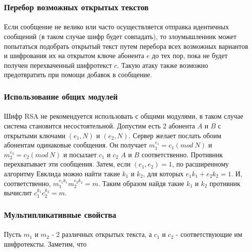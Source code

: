 \subsubsection{Перебор возможных открытых текстов}

  \paragraph{} Если сообщение не велико или часто осуществляется отправка идентичных сообщений (в таком случае шифр будет совпадать), то злоумышленник может попытаться подобрать открытый текст путем перебора всех возможных вариантов и шифрования их на открытом ключе абонента $e$ до тех пор, пока не будет получен перехваченный 
  шифротекст $c$. Такую атаку также возможно предотвратить при помощи добавок в сообщение.

\subsubsection{Использование общих модулей}

  \paragraph{} Шифр RSA не рекомендуется использовать с общими модулями, в таком случае система  становится несостоятельной. Допустим есть 2 абонента $A$ и $B$ с 
  открытыми ключами $(e_{1}, N)$ и $(e_{2}, N)$. Сервер желает послать обоим абонентам одинаковые сообщения. 
  Он получает $m_1^{e_1} = c_1(mod \: N)$ и $m_2^{e_2} = c_2(mod \: N)$ и посылает $c_1$ и 
  $c_2$ $A$ и $B$ соответственно. Противник перехватывает эти сообщения. Затем, если $(e_1, e_2) = 1$, по 
  расширенному алгоритму Евклида можно найти такие $k_1$ и $k_2$, для которых $e_1 k_1 + e_2 k_2 = 1$. И, соответственно, 
  $m_1^{e_1 k_1} m_2^{e_2 k_2} = m$. Таким образом найдя такие $k_1$ и $k_2$ противник вычислит $c_1^{k_1} c_2^{k_2} = m$.

\subsubsection{Мультипликативные свойства}

  \paragraph{} Пусть $m_1$ и $m_2$ - 2 различных открытых текста, а $c_1$
  и $c_2$ - соответствующие им шифротексты. Заметим, что
  

